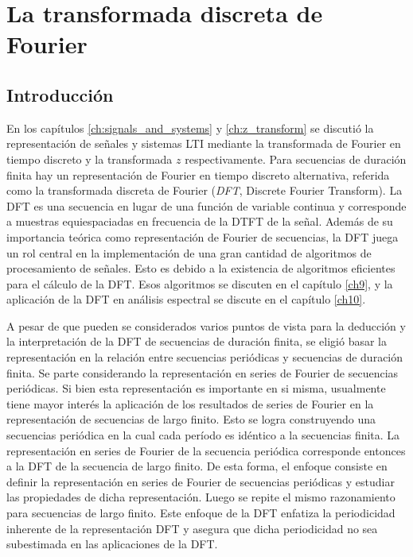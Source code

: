 \documentclass[a4paper]{report}
\begin{document}
\chapter{La transformada discreta de Fourier}\label{ch:dft}

\section{Introducción}

En los capítulos \ref{ch:signals_and_systems} y \ref{ch:z_transform} se discutió la representación de señales y sistemas LTI mediante la transformada de Fourier en tiempo discreto y la transformada \(z\) respectivamente. Para secuencias de duración finita hay un representación de Fourier en tiempo discreto alternativa, referida como la transformada discreta de Fourier (\emph{DFT}, Discrete Fourier Transform). La DFT es una secuencia en lugar de una función de variable continua y corresponde a muestras equiespaciadas en frecuencia de la DTFT de la señal. Además de su importancia teórica como representación de Fourier de secuencias, la DFT juega un rol central en la implementación de una gran cantidad de algoritmos de procesamiento de señales. Esto es debido a la existencia de algoritmos eficientes para el cálculo de la DFT. Esos algoritmos se discuten en el capítulo \ref{ch9}, y la aplicación de la DFT en análisis espectral se discute en el capítulo \ref{ch10}.

A pesar de que pueden se considerados varios puntos de vista para la deducción y la interpretación de la DFT de secuencias de duración finita, se eligió basar la representación en la relación entre secuencias periódicas y secuencias de duración finita. Se parte considerando la representación en series de Fourier de secuencias periódicas. Si bien esta representación es importante en si misma, usualmente tiene mayor interés la aplicación de los resultados de series de Fourier en la representación de secuencias de largo finito. Esto se logra construyendo una secuencias periódica en la cual cada período es idéntico a la secuencias finita. La representación en series de Fourier de la secuencia periódica corresponde entonces a la DFT de la secuencia de largo finito. De esta forma, el enfoque consiste en definir la representación en series de Fourier de secuencias periódicas y estudiar las propiedades de dicha representación. Luego se repite el mismo razonamiento para secuencias de largo finito. Este enfoque de la DFT enfatiza la periodicidad inherente de la representación DFT y asegura que dicha periodicidad no sea subestimada en las aplicaciones de la DFT. 
\end{document}
